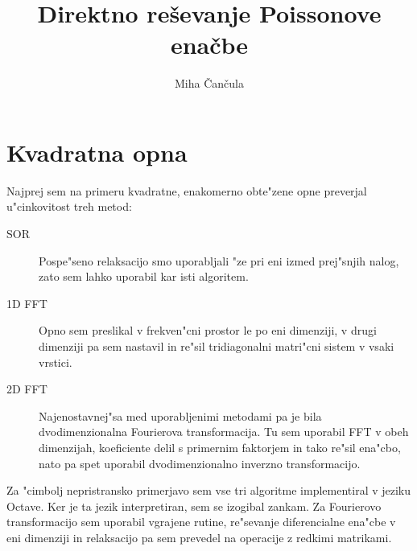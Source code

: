 \documentclass[a4paper,10pt]{article}
\title{Direktno re\v sevanje Poissonove ena\v cbe}
\author{Miha \v Can\v cula}
\begin{document}
\maketitle

\section{Kvadratna opna}

Najprej sem na primeru kvadratne, enakomerno obte"zene opne preverjal u"cinkovitost treh metod:

\begin{description}
  \item[SOR] Pospe"seno relaksacijo smo uporabljali "ze pri eni izmed prej"snjih nalog, zato sem lahko uporabil kar isti algoritem. 
  \item[1D FFT] Opno sem preslikal v frekven"cni prostor le po eni dimenziji, v drugi dimenziji pa sem nastavil in re"sil tridiagonalni matri"cni sistem v vsaki vrstici. 
  \item[2D FFT] Najenostavnej"sa med uporabljenimi metodami pa je bila dvodimenzionalna Fourierova transformacija. Tu sem uporabil FFT v obeh dimenzijah, koeficiente delil s primernim faktorjem in tako re"sil ena"cbo, nato pa spet uporabil dvodimenzionalno inverzno transformacijo. 
  
\end{description}

Za "cimbolj nepristransko primerjavo sem vse tri algoritme implementiral v jeziku Octave. Ker je ta jezik interpretiran, sem se izogibal zankam. Za Fourierovo transformacijo sem uporabil vgrajene rutine, re"sevanje diferencialne ena"cbe v eni dimenziji in relaksacijo pa sem prevedel na operacije z redkimi matrikami. 
\end{document}
